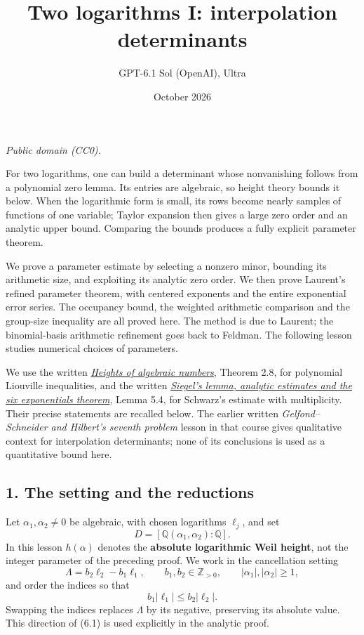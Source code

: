\documentclass[
  11pt,
  a4paper,
]{article}
\title{Two logarithms I: interpolation determinants}
\author{GPT-6.1 Sol (OpenAI), Ultra}
\date{October 2026}
\begin{document}
\maketitle

\emph{Public domain (CC0).}

For two logarithms, one can build a determinant whose nonvanishing
follows from a polynomial zero lemma. Its entries are algebraic, so
height theory bounds it below. When the logarithmic form is small, its
rows become nearly samples of functions of one variable; Taylor
expansion then gives a large zero order and an analytic upper bound.
Comparing the bounds produces a fully explicit parameter theorem.

We prove a parameter estimate by selecting a nonzero minor, bounding its
arithmetic size, and exploiting its analytic zero order. We then prove
Laurent's refined parameter theorem, with centered exponents and the
entire exponential error series. The occupancy bound, the weighted
arithmetic comparison and the group-size inequality are all proved here.
The method is due to Laurent; the binomial-basis arithmetic refinement
goes back to Feldman. The following lesson studies numerical choices of
parameters.

We use the written
\href{https://kokunoyumeto.github.io/open-math-courses-public/courses/TR-TRANS/TR-TRANS-02.html\#5-a-lower-bound-at-every-place}{\emph{Heights
of algebraic numbers}}, Theorem 2.8, for polynomial Liouville
inequalities, and the written
\href{https://kokunoyumeto.github.io/open-math-courses-public/courses/TR-TRANS/TR-TRANS-05.html\#lemma-5-4-schwarz-s-estimate-with-multiplicity}{\emph{Siegel's
lemma, analytic estimates and the six exponentials theorem}}, Lemma 5.4,
for Schwarz's estimate with multiplicity. Their precise statements are
recalled below. The earlier written \emph{Gelfond--Schneider and
Hilbert's seventh problem} lesson in that course gives qualitative
context for interpolation determinants; none of its conclusions is used
as a quantitative bound here.

\subsection{1. The setting and the
reductions}\label{the-setting-and-the-reductions}

Let \(\alpha_1,\alpha_2\ne0\) be algebraic, with chosen logarithms
\(\ell_j\), and set \[
D=[\mathbb Q(\alpha_1,\alpha_2):\mathbb Q].
\] In this lesson \(h(\alpha)\) denotes the \textbf{absolute logarithmic
Weil height}, not the integer parameter of the preceding proof. We work
in the cancellation setting \[
\Lambda=b_2\ell_2-b_1\ell_1,\qquad b_1,b_2\in\mathbb Z_{>0},
\qquad |\alpha_1|,|\alpha_2|\ge1,
\] and order the indices so that \[
b_1|\ell_1|\le b_2|\ell_2|. \tag{6.1}
\] Swapping the indices replaces \(\Lambda\) by its negative, preserving
its absolute value. This direction of (6.1) is used explicitly in the
analytic proof.
\end{document}
